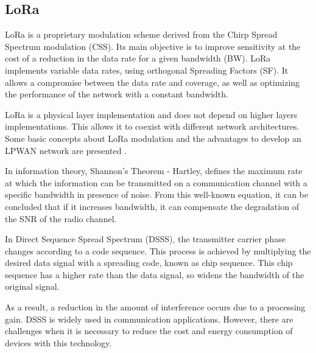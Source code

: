 \subsection{LoRa}
\label{sec:LoRa}

LoRa is a proprietary modulation scheme derived from the Chirp Spread Spectrum modulation (CSS). Its main objective is to improve sensitivity at the cost of a reduction in the data rate for a given bandwidth (BW). LoRa implements variable data rates, using orthogonal Spreading Factors (SF). It allows a compromise between the data rate and coverage, as well as optimizing the performance of the network with a constant bandwidth.

LoRa is a physical layer implementation and does not depend on higher layers implementations. This allows it to coexist with different network architectures. Some basic concepts about LoRa modulation and the advantages to develop an LPWAN network are presented \cite{Semtech2015}.

In information theory, Shannon's Theorem - Hartley, defines the maximum rate at which the information can be transmitted on a communication channel with a specific bandwidth in presence of noise. From this well-known equation, it can be concluded that if it increases bandwidth, it can compensate the degradation of the SNR of the radio channel.

In Direct Sequence Spread Spectrum (DSSS), the transmitter carrier phase changes according to a code sequence. This process is achieved by multiplying the desired data signal with a spreading code, known as chip sequence. This chip sequence has a higher rate than the data signal, so widens the bandwidth of the original signal.


As a result, a reduction in the amount of interference occurs due to a processing gain. DSSS is widely used in communication applications. However, there are challenges when it is necessary to reduce the cost and energy consumption of devices with this technology.


